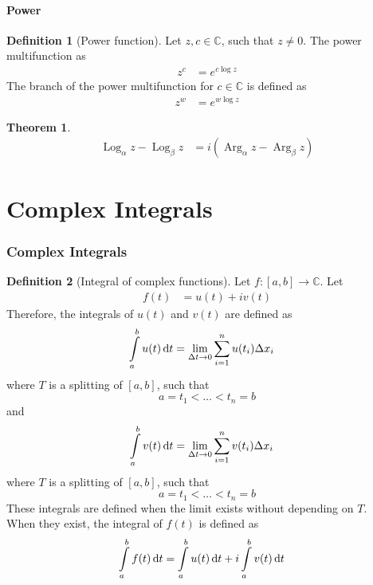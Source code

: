 \documentclass[titlepage, fleqn, a4paper, 12pt, twoside]{article}
\theoremstyle{definition}
\newtheorem{definition}{Definition}
\theoremstyle{theorem}
\newtheorem{theorem}{Theorem}
\DeclareMathOperator{\Arg}{Arg}
\DeclareMathOperator{\Log}{Log}
\begin{document}
\subsection{Power}

\begin{definition}[Power function]
	Let $z,c \in \mathbb{C}$, such that $z \neq 0$.
	The power multifunction as
	\begin{align*}
		z^c & = e^{c \log z}
	\end{align*}
	The branch of the power multifunction for $c \in \mathbb{C}$ is defined as
	\begin{align*}
		z^w & = e^{w \log z}
	\end{align*}
\end{definition}

\begin{theorem}
	\begin{align*}
		\Log_{\alpha} z - \Log_{\beta} z & = i \left( \Arg_{\alpha} z - \Arg_{\beta} z \right)
	\end{align*}
\end{theorem}

\newpage
\part{Complex Integrals}

\section{Complex Integrals}

\begin{definition}[Integral of complex functions]
	Let $f : [a,b] \to \mathbb{C}$.
	Let
	\begin{align*}
		f(t) & = u(t) + i v(t)
	\end{align*}
	Therefore, the integrals of $u(t)$ and $v(t)$ are defined as
	\begin{align*}
		\int\limits_{a}^{b} u(t) \dif t & = \lim\limits_{\Delta t \to 0} \sum\limits_{i = 1}^{n} u(t_i) \Delta x_i
	\end{align*}
	where $T$ is a splitting of $[a,b]$, such that
	\begin{equation*}
		a = t_1 < \dots < t_n = b
	\end{equation*}
	and
	\begin{align*}
		\int\limits_{a}^{b} v(t) \dif t & = \lim\limits_{\Delta t \to 0} \sum\limits_{i = 1}^{n} v(t_i) \Delta x_i
	\end{align*}
	where $T$ is a splitting of $[a,b]$, such that
	\begin{equation*}
		a = t_1 < \dots < t_n = b
	\end{equation*}
	These integrals are defined when the limit exists without depending on $T$.\\
	When they exist, the integral of $f(t)$ is defined as
	\begin{align*}
		\int\limits_{a}^{b} f(t) \dif t & = \int\limits_{a}^{b} u(t) \dif t + i \int\limits_{a}^{b} v(t) \dif t
	\end{align*}
\end{definition}
\end{document}

